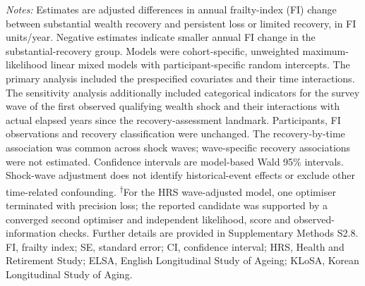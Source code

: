 \begin{landscape}
\parbox{\linewidth}{\raggedright\fontsize{9}{11}\selectfont\textit{Notes:} Estimates are adjusted differences in annual frailty-index (FI) change between substantial wealth recovery and persistent loss or limited recovery, in FI units/year. Negative estimates indicate smaller annual FI change in the substantial-recovery group. Models were cohort-specific, unweighted maximum-likelihood linear mixed models with participant-specific random intercepts. The primary analysis included the prespecified covariates and their time interactions. The sensitivity analysis additionally included categorical indicators for the survey wave of the first observed qualifying wealth shock and their interactions with actual elapsed years since the recovery-assessment landmark. Participants, FI observations and recovery classification were unchanged. The recovery-by-time association was common across shock waves; wave-specific recovery associations were not estimated. Confidence intervals are model-based Wald 95\% intervals. Shock-wave adjustment does not identify historical-event effects or exclude other time-related confounding. \textsuperscript{\ensuremath{\dagger}}For the HRS wave-adjusted model, one optimiser terminated with precision loss; the reported candidate was supported by a converged second optimiser and independent likelihood, score and observed-information checks. Further details are provided in Supplementary Methods S2.8. FI, frailty index; SE, standard error; CI, confidence interval; HRS, Health and Retirement Study; ELSA, English Longitudinal Study of Ageing; KLoSA, Korean Longitudinal Study of Aging.}
\endgroup
\end{landscape}
